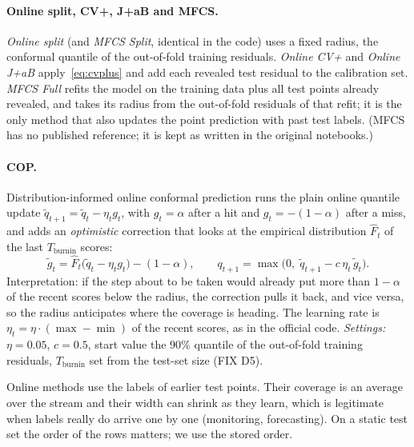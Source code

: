 \documentclass[11pt]{article}
\begin{document}
\paragraph{Online split, CV+, J+aB and MFCS.} \emph{Online split} (and \emph{MFCS Split}, identical in the code) uses a fixed
radius, the conformal quantile of the out-of-fold training residuals. \emph{Online CV+} and \emph{Online J+aB} apply~\eqref{eq:cvplus}
and add each revealed test residual to the calibration set. \emph{MFCS Full} refits the model on the training data plus all test
points already revealed, and takes its radius from the out-of-fold residuals of that refit; it is the only method that also
updates the point prediction with past test labels. (MFCS has no published reference; it is kept as written in the original
notebooks.)

\paragraph{COP.} Distribution-informed online conformal prediction \cite{hu2026cop} runs the plain online quantile update
$\tilde q_{t+1}=\tilde q_t-\eta_t g_t$, with $g_t=\alpha$ after a hit and $g_t=-(1-\alpha)$ after a miss, and adds an
\emph{optimistic} correction that looks at the empirical distribution $\hat F_t$ of the last $T_{\text{burnin}}$ scores:
\begin{equation}
\tilde g_t=\hat F_t\big(\tilde q_t-\eta_tg_t\big)-(1-\alpha),\qquad q_{t+1}=\max\big(0,\;\tilde q_{t+1}-c\,\eta_t\,\tilde g_t\big).
\end{equation}
Interpretation: if the step about to be taken would already put more than $1-\alpha$ of the recent scores below the radius, the
correction pulls it back, and vice versa, so the radius anticipates where the coverage is heading. The learning rate is
$\eta_t=\eta\cdot(\max-\min)$ of the recent scores, as in the official code. \emph{Settings:} $\eta=0.05$, $c=0.5$, start value the
90\% quantile of the out-of-fold training residuals, $T_{\text{burnin}}$ set from the test-set size (FIX D5).

\begin{insight}
Online methods use the labels of earlier test points. Their coverage is an average over the stream and their width can
shrink as they learn, which is legitimate when labels really do arrive one by one (monitoring, forecasting). On a static test set
the order of the rows matters; we use the stored order.
\end{insight}
\end{document}
